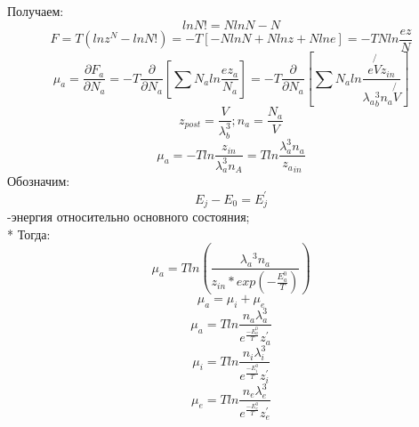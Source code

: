 \documentclass[letterpaper,12pt]{article} %
\begin{document}
Получаем:
\begin{equation} \label{eq:aperp} %
ln{N!}=NlnN-N 
\end{equation}
\begin{equation} \label{eq:aperp} %
F=T(ln{z^N} - ln{N!})=-T[-NlnN + Nlnz + Nln{e}]= - TNln{\frac{ez}{N}}
\end{equation}
 \begin{equation} \label{eq:aperp} %
\mu_{a}=\frac{\partial F_a}{\partial N_a}=-T \frac{\partial}{\partial N_a}[\sum N_a ln{\frac{ez_a}{N_a}}]=-T\frac{\partial}{\partial N_a}[\sum N_a ln{\frac{e \not{V} z_{in}}{\lambda{_a}^3_{b}n_a \not{V} }}] 
\end{equation}
\begin{equation} \label{eq:aperp} %
z_{post}=\frac{V}{\lambda^3_{b}}; n_a=\frac{N_a}{V} 
\end{equation}
\begin{equation} \label{eq:aperp} %
\mu_a=-T ln{\frac{z_{in}}{\lambda^3_a n_A}}= T ln{\frac{\lambda^3_a n_a}{z{_a}_{in}}} 
\end{equation}
Обозначим:
\begin{equation} \label{eq:aperp} %
E_{j}-E_{0}=E_{j}^{'}
\end{equation} -энергия относительно основного состояния;
\\*
Тогда:
\begin{equation} \label{eq:aperp} %
\mu_a = Tln(\frac{\lambda{_a}^3 n_a}{z_{in}*exp(- \frac{E_{a}^{0}}{T})})
\end{equation}
\begin{equation} \label{eq:aperp} %
\mu_{a}=\mu_{i} + \mu_{e} 
\end{equation}
\begin{equation} \label{eq:aperp} %
\mu_{a}=Tln{\frac{n_a \lambda_{a}^{3}}{e^{\frac{-E_{a}^{0}}{T}}z_{a}^{'}}} 
\end{equation}
\begin{equation} \label{eq:aperp} %
\mu_{i}=Tln{\frac{n_i \lambda_{i}^{3}}{e^{\frac{-E_{i}^{0}}{T}}z_{i}^{'}}}
\end{equation}
\begin{equation} \label{eq:aperp} %
\mu_{e}=Tln{\frac{n_e \lambda_{e}^{3}}{e^{\frac{-E_{e}^{0}}{T}}z_{e}^{'}}}
\end{equation}
\end{document}
